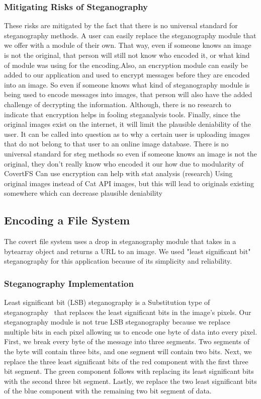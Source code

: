 \subsubsection{Mitigating Risks of Steganography}
These risks are mitigated by the fact that there is no universal standard for steganography methods. A user can easily replace the steganography module that we offer with a module of their own. That way, even if someone knows an image is not the original, that person will still not know who encoded it, or what kind of module was using for the encoding.Also, an encryption module can easily be added to our application and used to encrypt messages before they are encoded into an image. So even if someone knows what kind of steganography module is being used to encode messages into images, that person will also have the added challenge of decrypting the information. Although, there is no research to indicate that encryption helps in fooling steganalysis tools. Finally, since the original images exist on the internet, it will limit the plausible deniability of the user. It can be called into question as to why a certain user is uploading images that do not belong to that user to an online image database. 
There is no universal standard for steg methods
		so even if someone knows an image is not the original, they don't really know who encoded it our how due to modularity of CovertFS
	Can use encryption
		can help with stat analysis (research)
Using original images instead of Cat API images, but this will lead to originals existing somewhere which can decrease plausible deniability 

\subsection{Encoding a File System}

The covert file system uses a drop in steganography module that takes in a bytearray object and returns a URL to an image. We used "least significant bit" steganography for this application because of its simplicity and reliability.

\subsubsection{Steganography Implementation}

Least significant bit (LSB) steganography is a Substitution type of steganography~\cite{Nosrati2011} that replaces the least significant bits in the image's pixels. Our steganography module is not true LSB steganography because we replace multiple bits in each pixel allowing us to encode one byte of data into every pixel. First, we break every byte of the message into three segments. Two segments of the byte will contain three bits, and one segment will contain two bits. Next, we replace the three least significant bits of the red component with the first three bit segment. The green component follows with replacing its least significant bits with the second three bit segment. Lastly, we replace the two least significant bits of the blue component with the remaining two bit segment of data. 

